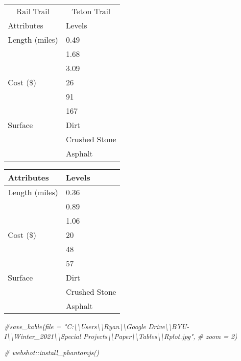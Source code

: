 \documentclass[
]{article}
\newenvironment{Shaded}{\begin{snugshade}}{\end{snugshade}}
\newcommand{\CommentTok}[1]{\textcolor[rgb]{0.56,0.35,0.01}{\textit{#1}}}
\begin{document}
\begin{table}
\caption{\label{tab:unnamed-chunk-3}Choice Experiment Design}
\begin{table}

\centering
\begin{tabular}[t]{l|l}
\hline
\multicolumn{1}{c|}{Rail Trail} & \multicolumn{1}{c}{Teton Trail} \\
\cline{1-1} \cline{2-2}
Attributes & Levels\\
\hline
Length (miles) & 0.49\\
\hline
 & 1.68\\
\hline
 & 3.09\\
\hline
Cost (\$) & 26\\
\hline
 & 91\\
\hline
 & 167\\
\hline
Surface & Dirt\\
\hline
 & Crushed Stone\\
\hline
 & Asphalt\\
\hline
\end{tabular}
\end{table}\begin{table}

\centering
\begin{tabular}[t]{l|l}
\hline
Attributes & Levels\\
\hline
Length (miles) & 0.36\\
\hline
 & 0.89\\
\hline
 & 1.06\\
\hline
Cost (\$) & 20\\
\hline
 & 48\\
\hline
 & 57\\
\hline
Surface & Dirt\\
\hline
 & Crushed Stone\\
\hline
 & Asphalt\\
\hline
\end{tabular}
\end{table}
\end{table}

\begin{Shaded}
\begin{Highlighting}[]
  \CommentTok{#save_kable(file = "C:\textbackslash{}\textbackslash{}Users\textbackslash{}\textbackslash{}Ryan\textbackslash{}\textbackslash{}Google Drive\textbackslash{}\textbackslash{}BYU-I\textbackslash{}\textbackslash{}Winter_2021\textbackslash{}\textbackslash{}Special Projects\textbackslash{}\textbackslash{}Paper\textbackslash{}\textbackslash{}Tables\textbackslash{}\textbackslash{}Rplot.jpg",}
            \CommentTok{# zoom = 2)}


\CommentTok{# webshot::install_phantomjs()}
\end{Highlighting}
\end{Shaded}
\end{document}
